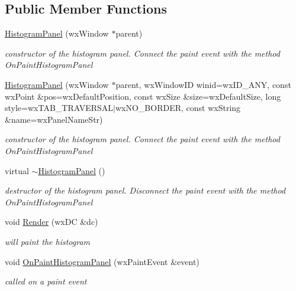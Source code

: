 \subsection*{Public Member Functions}
\begin{DoxyCompactItemize}
\item 
\mbox{\label{classHistogramPanel_afae620a0f5e69c71de57c8d9610fb911}} 
\hyperlink{classHistogramPanel_afae620a0f5e69c71de57c8d9610fb911}{Histogram\+Panel} (wx\+Window $\ast$parent)
\begin{DoxyCompactList}\small\item\em constructor of the histogram panel. Connect the paint event with the method On\+Paint\+Histogram\+Panel \end{DoxyCompactList}\item 
\mbox{\label{classHistogramPanel_a7f1668e529cbdc1851722e0d4cb7f37c}} 
\hyperlink{classHistogramPanel_a7f1668e529cbdc1851722e0d4cb7f37c}{Histogram\+Panel} (wx\+Window $\ast$parent, wx\+Window\+ID winid=wx\+I\+D\+\_\+\+A\+NY, const wx\+Point \&pos=wx\+Default\+Position, const wx\+Size \&size=wx\+Default\+Size, long style=wx\+T\+A\+B\+\_\+\+T\+R\+A\+V\+E\+R\+S\+AL$\vert$wx\+N\+O\+\_\+\+B\+O\+R\+D\+ER, const wx\+String \&name=wx\+Panel\+Name\+Str)
\begin{DoxyCompactList}\small\item\em constructor of the histogram panel. Connect the paint event with the method On\+Paint\+Histogram\+Panel \end{DoxyCompactList}\item 
\mbox{\label{classHistogramPanel_a24da6285c42aa63d9ab5dace94495133}} 
virtual \hyperlink{classHistogramPanel_a24da6285c42aa63d9ab5dace94495133}{$\sim$\+Histogram\+Panel} ()
\begin{DoxyCompactList}\small\item\em destructor of the histogram panel. Disconnect the paint event with the method On\+Paint\+Histogram\+Panel \end{DoxyCompactList}\item 
void \hyperlink{classHistogramPanel_a3fd17f66a3e7dbd529f417326c257bce}{Render} (wx\+DC \&dc)
\begin{DoxyCompactList}\small\item\em will paint the histogram \end{DoxyCompactList}\item 
void \hyperlink{classHistogramPanel_aed5b0e0dadd258cc29cd6a6d5dfed0e8}{On\+Paint\+Histogram\+Panel} (wx\+Paint\+Event \&event)
\begin{DoxyCompactList}\small\item\em called on a paint event \end{DoxyCompactList}\end{DoxyCompactItemize}
